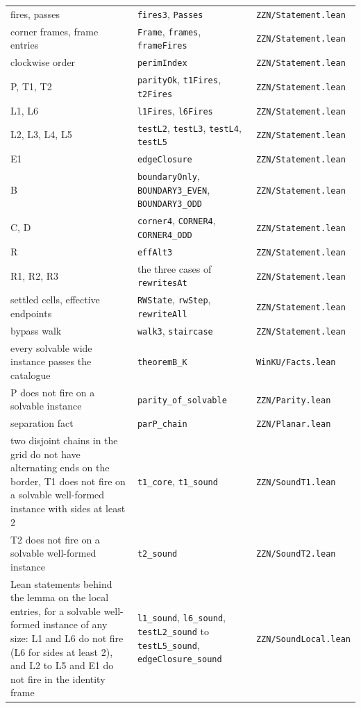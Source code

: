 \documentclass[11pt]{article}
\newcommand{\lean}[1]{\texttt{#1}}
\newcommand{\lf}[1]{\nolinkurl{#1}}
\begin{document}
{\begin{longtable}{@{}>{\raggedright\arraybackslash}p{}>{\raggedright\arraybackslash}p{}>{\raggedright\arraybackslash}p{}@{}}
fires, passes & \lean{fires3}, \lean{Passes} & \lf{ZZN/Statement.lean} \\
corner frames, frame entries & \lean{Frame}, \lean{frames}, \lean{frameFires} & \lf{ZZN/Statement.lean} \\
clockwise order & \lean{perimIndex} & \lf{ZZN/Statement.lean} \\
P, T1, T2 & \lean{parityOk}, \lean{t1Fires}, \lean{t2Fires} & \lf{ZZN/Statement.lean} \\
L1, L6 & \lean{l1Fires}, \lean{l6Fires} & \lf{ZZN/Statement.lean} \\
L2, L3, L4, L5 & \lean{testL2}, \lean{testL3}, \lean{testL4}, \lean{testL5} & \lf{ZZN/Statement.lean} \\
E1 & \lean{edgeClosure} & \lf{ZZN/Statement.lean} \\
B & \lean{boundaryOnly}, \lean{BOUNDARY3\_EVEN}, \lean{BOUNDARY3\_ODD} & \lf{ZZN/Statement.lean} \\
C, D & \lean{corner4}, \lean{CORNER4}, \lean{CORNER4\_ODD} & \lf{ZZN/Statement.lean} \\
R & \lean{effAlt3} & \lf{ZZN/Statement.lean} \\
R1, R2, R3 & the three cases of \lean{rewritesAt} & \lf{ZZN/Statement.lean} \\
settled cells, effective endpoints & \lean{RWState}, \lean{rwStep}, \lean{rewriteAll} & \lf{ZZN/Statement.lean} \\
bypass walk & \lean{walk3}, \lean{staircase} & \lf{ZZN/Statement.lean} \\
every solvable wide instance passes the catalogue & \lean{theoremB\_K} & \lf{WinKU/Facts.lean} \\
P does not fire on a solvable instance & \lean{parity\_of\_solvable} & \lf{ZZN/Parity.lean} \\
separation fact & \lean{parP\_chain} & \lf{ZZN/Planar.lean} \\
two disjoint chains in the grid do not have alternating ends on the border, T1 does not fire on a solvable well-formed instance with sides at least 2 & \lean{t1\_core}, \lean{t1\_sound} & \lf{ZZN/SoundT1.lean} \\
T2 does not fire on a solvable well-formed instance & \lean{t2\_sound} & \lf{ZZN/SoundT2.lean} \\
Lean statements behind the lemma on the local entries, for a solvable well-formed instance of any size: L1 and L6 do not fire (L6 for sides at least 2), and L2 to L5 and E1 do not fire in the identity frame & \lean{l1\_sound}, \lean{l6\_sound}, \lean{testL2\_sound} to \lean{testL5\_sound}, \lean{edgeClosure\_sound} & \lf{ZZN/SoundLocal.lean} \\

\end{longtable}}
\end{document}
